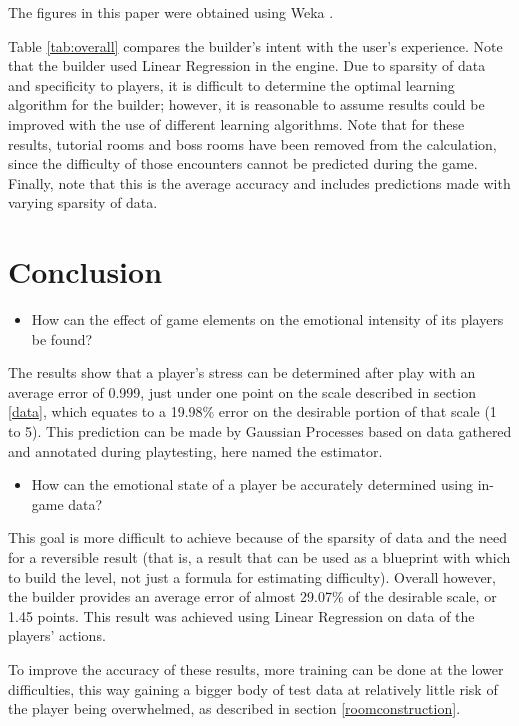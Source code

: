 \documentclass[a4paper]{article}
\begin{document}
\begin{multicols*}{2}
The figures in this paper were obtained using Weka \cite{weka}.

Table \ref{tab:overall} compares the builder's intent with the user's experience. Note that the builder used Linear Regression in the engine.
Due to sparsity of data and specificity to players, it is difficult to determine the optimal learning algorithm for the builder; however, it is reasonable to assume results could be improved with the use of different learning algorithms. 
Note that for these results, tutorial rooms and boss rooms have been removed from the calculation, since the difficulty of those encounters cannot be predicted during the game.
Finally, note that this is the average accuracy and includes predictions made with varying sparsity of data.

\section{Conclusion}
\begin{itemize} \item[\textbf{1.}] How can the effect of game elements on the emotional intensity of its players be found? \end{itemize}
The results show that a player's stress can be determined after play with an average error of 0.999, just under one point on the scale described in section \ref{data}, which equates to a 19.98\% error on the desirable portion of that scale (1 to 5). This prediction can be made by Gaussian Processes based on data gathered and annotated during playtesting, here named the estimator.

\begin{itemize} \item[\textbf{2.}] How can the emotional state of a player be accurately determined using in-game data? \end{itemize}
This goal is more difficult to achieve because of the sparsity of data and the need for a reversible result (that is, a result that can be used as a blueprint with which to build the level, not just a formula for estimating difficulty). Overall however, the builder provides an average error of almost 29.07\% of the desirable scale, or 1.45 points. This result was achieved using Linear Regression on data of the players' actions.

To improve the accuracy of these results, more training can be done at the lower difficulties, this way gaining a bigger body of test data at relatively little risk of the player being overwhelmed, as described in section \ref{roomconstruction}. 


\end{multicols*}
\end{document}
